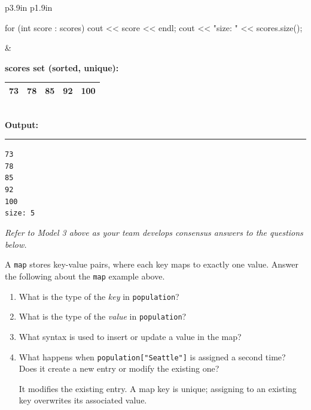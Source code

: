 \begin{center}
\begin{tabular}{p{3.9in} p{1.9in}}
\begin{minipage}{3.9in}
\begin{cpplst}
for (int score : scores) {
    cout << score << endl;
}
cout << "size: " << scores.size();
        \end{cpplst}
      \end{minipage}
      &
      \begin{minipage}{1.9in}
        {\bf scores set (sorted, unique):}\\[4pt]
        \begin{tabular}{|c|c|c|c|c|}
          \hline
          73 & 78 & 85 & 92 & 100 \\
          \hline
        \end{tabular}\\[10pt]
        {\bf Output:}
        \hrule\vskip 5pt
        {\tt 73}\\
        {\tt 78}\\
        {\tt 85}\\
        {\tt 92}\\
        {\tt 100}\\
        {\tt size: 5}
      \end{minipage}
    \end{tabular}
  \end{center}

  {\it\large Refer to Model 3 above as your team develops consensus answers
    to the questions below.}


  \Q A {\tt map} stores key-value pairs, where each key maps to exactly
    one value.  Answer the following about the {\tt map} example above.
    \begin{enumerate}
      \itemsep 10pt
      \item What is the type of the {\it key} in {\tt population}?
        \hfill{}

      \item What is the type of the {\it value} in {\tt population}?
        \hfill{}

      \item What syntax is used to insert or update a value in the map?
        \hfill{}

      \newpage

      \item What happens when {\tt population["Seattle"]} is assigned
        a second time?  Does it create a new entry or modify the existing one?

        \vskip -5pt

        \begin{answer}[0.5in]
          It modifies the existing entry.  A map key is unique; assigning
          to an existing key overwrites its associated value.
        \end{answer}
    \end{enumerate}


